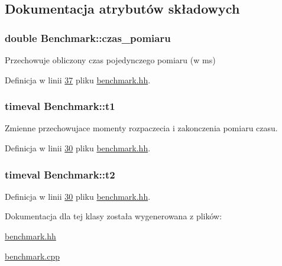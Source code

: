 \subsection{Dokumentacja atrybutów składowych}
\hypertarget{class_benchmark_ab72b3cbe324970fd8c738f03718d52fc}{
\subsubsection[{czas\-\_\-pomiaru}]{\setlength{\rightskip}{0pt plus 5cm}double Benchmark\-::czas\-\_\-pomiaru\hspace{0.3cm}{\ttfamily [private]}}}\label{class_benchmark_ab72b3cbe324970fd8c738f03718d52fc}
Przechowuje obliczony czas pojedynczego pomiaru (w ms) 

Definicja w linii \hyperlink{benchmark_8hh_source_l00037}{37} pliku \hyperlink{benchmark_8hh_source}{benchmark.\-hh}.

\hypertarget{class_benchmark_ab951e55dc4470926e0eb0761804f13bc}{
\subsubsection[{t1}]{\setlength{\rightskip}{0pt plus 5cm}timeval Benchmark\-::t1\hspace{0.3cm}{\ttfamily [private]}}}\label{class_benchmark_ab951e55dc4470926e0eb0761804f13bc}
Zmienne przechowujace momenty rozpaczecia i zakonczenia pomiaru czasu. 

Definicja w linii \hyperlink{benchmark_8hh_source_l00030}{30} pliku \hyperlink{benchmark_8hh_source}{benchmark.\-hh}.

\hypertarget{class_benchmark_a2b145dd2458fea33d6df41f310058bec}{
\subsubsection[{t2}]{\setlength{\rightskip}{0pt plus 5cm}timeval Benchmark\-::t2\hspace{0.3cm}{\ttfamily [private]}}}\label{class_benchmark_a2b145dd2458fea33d6df41f310058bec}


Definicja w linii \hyperlink{benchmark_8hh_source_l00030}{30} pliku \hyperlink{benchmark_8hh_source}{benchmark.\-hh}.



Dokumentacja dla tej klasy została wygenerowana z plików\-:\begin{DoxyCompactItemize}
\item 
\hyperlink{benchmark_8hh}{benchmark.\-hh}\item 
\hyperlink{benchmark_8cpp}{benchmark.\-cpp}\end{DoxyCompactItemize}
